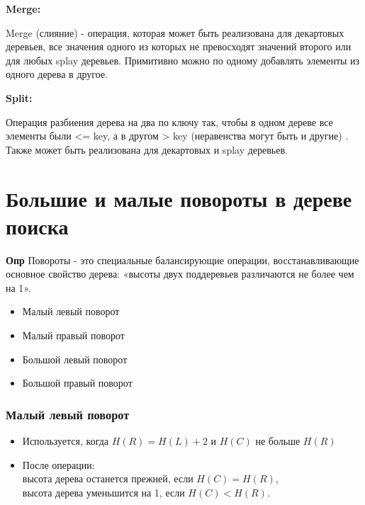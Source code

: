 \textbf{Merge: }

Merge (слияние) - операция, которая может быть реализована для декартовых деревьев, все значения одного из которых не превосходят значений второго или для любых splay деревьев. 
Примитивно можно по одному добавлять элементы из одного дерева в другое.

\textbf{Split: }

Операция разбиения дерева на два по ключу так, чтобы в одном дереве все элементы были <= key, а в другом > key (неравенства могут быть и другие) . Также может быть реализована для декартовых и splay деревьев. 

\setcounter{section}{40}
\section{Большие и малые повороты в дереве поиска}

\textbf{Опр} Повороты - это специальные балансирующие операции, восстанавливающие основное свойство дерева: «высоты двух поддеревьев различаются не более чем на 1».

\begin{itemize}
    \item Малый левый поворот
    \item Малый правый поворот
    \item Большой левый поворот
    \item Большой правый поворот
\end{itemize}

\subsubsection*{Малый левый поворот}

\begin{itemize}
    \item Используется, когда $H(R) = H(L) + 2$ и $H(C)$ не больше $H(R)$
    \item После операции:
    \\
    высота дерева останется прежней, если $H(C) = H(R)$,
    \\
    высота дерева уменьшится на 1, если $H(C) < H(R)$.
\end{itemize}

\begin{figure}[h]
\end{figure}

